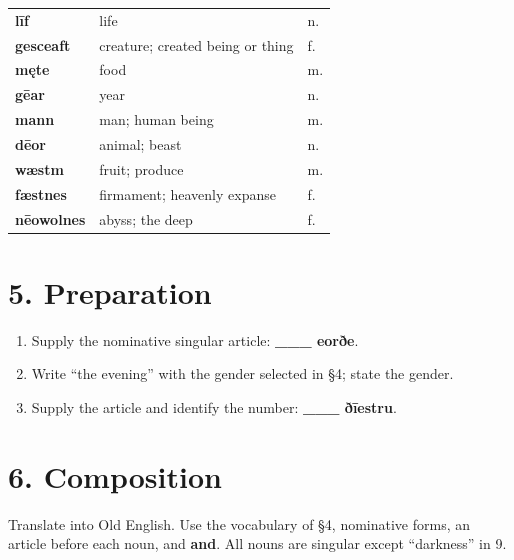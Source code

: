 \begin{longtable}{@{}>{\raggedright\arraybackslash}p{30mm} >{\raggedright\arraybackslash}p{63mm} >{\raggedright\arraybackslash}p{26mm}@{}}
\textbf{līf} & life & n. \\
\textbf{gesceaft} & creature; created being or thing & f. \\
\textbf{męte} & food & m. \\
\textbf{gēar} & year & n. \\
\textbf{mann} & man; human being & m. \\
\textbf{dēor} & animal; beast & n. \\
\textbf{wæstm} & fruit; produce & m. \\
\textbf{fæstnes} & firmament; heavenly expanse & f. \\
\textbf{nēowolnes} & abyss; the deep & f. \\
\end{longtable}
\endgroup


\clearpage
{}
\section*{5. Preparation}


\begin{enumerate}
\item[1.] Supply the nominative singular article: \textbf{\_\_\_ eorðe}.
\item[2.] Write “the evening” with the gender selected in §4; state the gender.
\item[3.] Supply the article and identify the number: \textbf{\_\_\_ ðīestru}.
\end{enumerate}


\section*{6. Composition}


Translate into Old English. Use the vocabulary of §4, nominative forms, an article before each noun, and \textbf{and}. All nouns are singular except “darkness” in 9.


